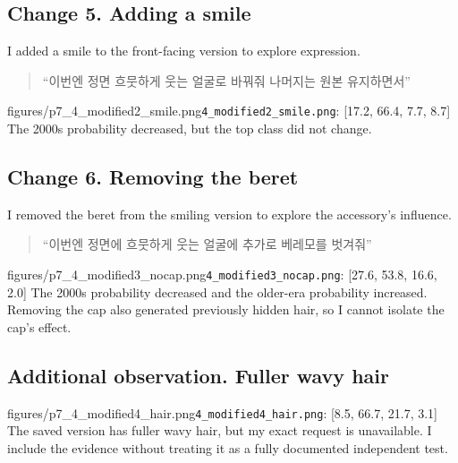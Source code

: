 \documentclass[11pt]{article}
\begin{document}
\subsection*{Change 5. Adding a smile}
I added a smile to the front-facing version to explore expression.
\begin{quote}“이번엔 정면 흐뭇하게 웃는 얼굴로 바꿔줘 나머지는 원본 유지하면서”\end{quote}
{figures/p7_4_modified2_smile.png}{\texttt{4\_modified2\_smile.png}: [17.2, 66.4, 7.7, 8.7]}
The 2000s probability decreased, but the top class did not change.

\subsection*{Change 6. Removing the beret}
I removed the beret from the smiling version to explore the accessory's influence.
\begin{quote}“이번엔 정면에 흐뭇하게 웃는 얼굴에 추가로 베레모를 벗겨줘”\end{quote}
{figures/p7_4_modified3_nocap.png}{\texttt{4\_modified3\_nocap.png}: [27.6, 53.8, 16.6, 2.0]}
The 2000s probability decreased and the older-era probability increased. Removing the cap also generated previously hidden hair, so I cannot isolate the cap's effect.

\subsection*{Additional observation. Fuller wavy hair}
{figures/p7_4_modified4_hair.png}{\texttt{4\_modified4\_hair.png}: [8.5, 66.7, 21.7, 3.1]}
The saved version has fuller wavy hair, but my exact request is unavailable. I include the evidence without treating it as a fully documented independent test.
\end{document}
